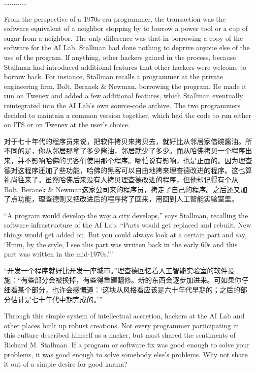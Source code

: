 \ifdefined\chs
............
\fi

\ifdefined\eng
From the perspective of a 1970s-era programmer, the transaction was the software equivalent of a neighbor stopping by to borrow a power tool or a cup of sugar from a neighbor. The only difference was that in borrowing a copy of the software for the AI Lab, Stallman had done nothing to deprive anyone else of the use of the program. If anything, other hackers gained in the process, because Stallman had introduced additional features that other hackers were welcome to borrow back.  For instance, Stallman recalls a programmer at the private engineering firm, Bolt, Beranek \& Newman, borrowing the program. He made it run on Twenex and added a few additional features, which Stallman eventually reintegrated into the AI Lab's own source-code archive.  The two programmers decided to maintain a common version together, which had the code to run either on ITS or on Twenex at the user's choice.
\fi

\ifdefined\chs
对于七十年代的程序员来说，把软件拷贝来拷贝去，就好比从邻居家借碗酱油。所不同的是，你从邻居那拿了多少酱油，邻居就少了多少。而从哈佛拷贝一个程序出来，并不影响哈佛的黑客们使用那个程序。哪怕说有影响，也是正面的。因为理查德对这程序还加了些功能，哈佛的黑客可以自由地拷来理查德改进的程序。这也算礼尚往来了。虽然哈佛后来没有人拷贝理查德改进的程序，但他却记得有个从Bolt, Beranek \& Newman这家公司来的程序员，拷走了自己的程序。之后还又加了点功能，理查德则又把改进后的程序拷了回来，用回到人工智能实验室里。
\fi

\ifdefined\eng
``A program would develop the way a city develops,'' says Stallman, recalling the software infrastructure of the AI Lab. ``Parts would get replaced and rebuilt. New things would get added on. But you could always look at a certain part and say, `Hmm, by the style, I see this part was written back in the early 60s and this part was written in the mid-1970s.'\hspace{0.01in}''
\fi

\ifdefined\chs
“开发一个程序就好比开发一座城市。”理查德回忆着人工智能实验室的软件设施：“有些部分会被换掉，有些得重建翻修。新的东西会逐步加进来。可如果你仔细看某个部分，也许会感慨道：‘这块从风格看应该是六十年代早期的；之后的部分估计是七十年代中期完成的。’”
\fi

\ifdefined\eng
Through this simple system of intellectual accretion, hackers at the AI Lab and other places built up robust creations. Not every programmer participating in this culture described himself as a hacker, but most shared the sentiments of Richard M. Stallman. If a program or software fix was good enough to solve your problems, it was good enough to solve somebody else's problems. Why not share it out of a simple desire for good karma?
\fi

